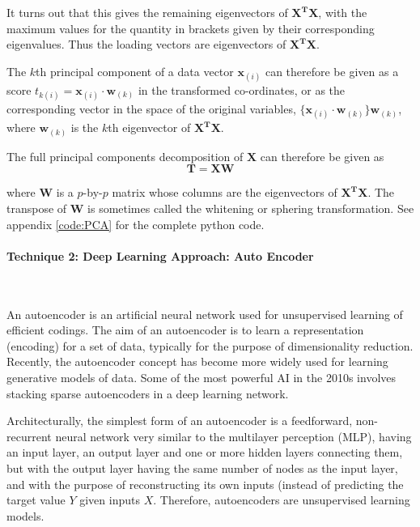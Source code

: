 \documentclass{mcmthesis}
\begin{document}
It turns out that this gives the remaining eigenvectors of $\mathbf{X^TX}$, with the maximum values for the quantity in brackets given by their corresponding eigenvalues. Thus the loading vectors are eigenvectors of $\mathbf{X^TX}$.

The $k$th principal component of a data vector $\mathbf{x}_{(i)}$ can therefore be given as a score $t_{k(i)} = \mathbf{x}_{(i)} \cdot \mathbf{w}_{(k)}$ in the transformed co-ordinates, or as the corresponding vector in the space of the original variables, $\{\mathbf{x}_{(i)} \cdot \mathbf{w}_{(k)}\} \mathbf{w}_{(k)}$, where $\mathbf{w}_{(k)}$ is the $k$th eigenvector of $\mathbf{X^TX}$.

The full principal components decomposition of $\mathbf{X}$ can therefore be given as
\begin{equation}
    \mathbf {T} =\mathbf {X} \mathbf {W}
\end{equation}

where $\mathbf{W}$ is a $p$-by-$p$ matrix whose columns are the eigenvectors of $\mathbf{X^TX}$. The transpose of $\mathbf{W}$ is sometimes called the whitening or sphering transformation. See appendix \ref{code:PCA} for the complete python code. 

\paragraph{\textbf{Technique 2: Deep Learning Approach: Auto Encoder}}

~\smallskip

An autoencoder is an artificial neural network used for unsupervised learning of efficient codings. The aim of an autoencoder is to learn a representation (encoding) for a set of data, typically for the purpose of dimensionality reduction. Recently, the autoencoder concept has become more widely used for learning generative models of data. Some of the most powerful AI in the 2010s involves stacking sparse autoencoders in a deep learning network.

Architecturally, the simplest form of an autoencoder is a feedforward, non-recurrent neural network very similar to the multilayer perception (MLP), having an input layer, an output layer and one or more hidden layers connecting them, but with the output layer having the same number of nodes as the input layer, and with the purpose of reconstructing its own inputs (instead of predicting the target value $Y$ given inputs $X$. Therefore, autoencoders are unsupervised learning models.
\end{document}
